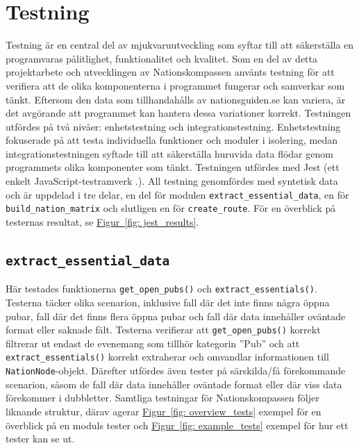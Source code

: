 \documentclass[a4paper, 12pt]{article}
\begin{document}
\section{Testning}
    Testning är en central del av mjukvaruutveckling som syftar till att säkerställa en programvaras pålitlighet, funktionalitet och kvalitet. Som en del av detta projektarbete och utvecklingen av Nationskompassen använts testning för att verifiera att de olika komponenterna i programmet fungerar och samverkar som tänkt. Eftersom den data som tillhandahålls av nationsguiden.se kan variera, är det avgörande att programmet kan hantera dessa variationer korrekt. Testningen utfördes på två nivåer: enhetstestning och integrationstestning. Enhetstestning fokuserade på att testa individuella funktioner och moduler i isolering, medan integrationstestningen syftade till att säkerställa huruvida data flödar genom programmets olika komponenter som tänkt. Testningen utfördes med Jest (ett enkelt JavaScript-testramverk \cite{jest}.). All testning genomfördes med syntetisk data och är uppdelad i tre delar, en del för modulen \texttt{extract\_essential\_data}, en för \texttt{build\_nation\_matrix} och slutligen en för \texttt{create\_route}. För en överblick på testernas resultat, se \hyperref[fig: jest_results]{Figur~\ref*{fig: jest_results}}.

    \subsection{\texttt{extract\_essential\_data}}
    \label{subsec: extract_essential_data}
        Här testades funktionerna \texttt{get\_open\_pubs()} och \texttt{extract\_essentials()}. Testerna täcker olika scenarion, inklusive fall där det inte finns några öppna pubar, fall där det finns flera öppna pubar och fall där data innehåller oväntade format eller saknade fält. Testerna verifierar att \texttt{get\_open\_pubs()} korrekt filtrerar ut endast de evenemang som tillhör kategorin ''Pub'' och att \texttt{extract\_essentials()} korrekt extraherar och omvandlar informationen till \texttt{NationNode}-objekt. Därefter utfördes även tester på särskilda/få förekommande scenarion, såsom de fall där data innehåller oväntade format eller där viss data förekommer i dubbletter. Samtliga testningar för Nationskompassen följer liknande struktur, därav agerar \hyperref[fig: overview_tests]{Figur~\ref*{fig: overview_tests}} exempel för en överblick på en moduls tester och \hyperref[fig: example_tests]{Figur~\ref*{fig: example_tests}} exempel för hur ett tester kan se ut.
\end{document}

